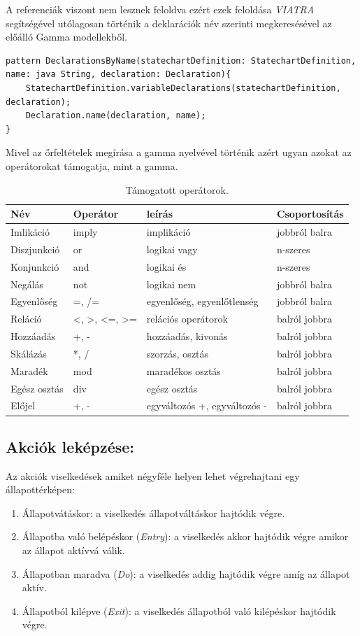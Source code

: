 A referenciák viszont nem lesznek feloldva ezért ezek feloldása \emph{VIATRA} segítségével utólagosan történik a deklarációk név szerinti megkeresésével az előálló Gamma modellekből.
\lstset{style=VQL}
\begin{lstlisting}
pattern DeclarationsByName(statechartDefinition: StatechartDefinition, name: java String, declaration: Declaration){
	StatechartDefinition.variableDeclarations(statechartDefinition, declaration);
	Declaration.name(declaration, name);
}
\end{lstlisting}
 Mivel az őrfeltételek megírása a gamma nyelvével történik azért ugyan azokat az operátorokat támogatja, mint a gamma.

\begin{table}[!h]
	\footnotesize
	\centering
	\begin{tabular}{ l l l l }
		Név & Operátor& leírás & Csoportosítás \\ \hline
		 Imlikáció & imply & implikáció & jobbról balra \\
		 Diszjunkció & or & logikai vagy & n-szeres\\
		 Konjunkció & and & logikai és & n-szeres \\
		 Negálás & not & logikai nem & jobbról balra \\
		 Egyenlőség & =, /= & egyenlőség, egyenlőtlenség & jobbról balra \\
		 Reláció & <, >, <=, >= & relációs operátorok & balról jobbra \\  
		 Hozzáadás & +, - & hozzáadás, kivonás & balról jobbra \\
		 Skálázás & *, / & szorzás, osztás & balról jobbra \\
		 Maradék & mod & maradékos osztás & balról jobbra \\
		 Egész osztás & div & egész osztás & balról jobbra \\
		 Előjel & +, - & egyváltozós +, egyváltozós - & balról jobbra
	\end{tabular}
	\caption{Támogatott operátorok.}
	\label{table:operators}
\end{table}


\subsection{Akciók leképzése:}
Az akciók viselkedések amiket négyféle helyen lehet végrehajtani egy állapottérképen:

\begin{enumerate}
	\item Állapotvátáskor: a viselkedés állapotváltáskor hajtódik végre.
	\item Állapotba való belépéskor (\emph{Entry}): a viselkedés akkor hajtódik végre amikor az állapot aktívvá válik.
	\item Állapotban maradva (\emph{Do}): a viselkedés addig hajtódik végre amíg az állapot aktív.
	\item Állapotból kilépve (\emph{Exit}): a viselkedés állapotból való kilépéskor hajtódik végre.
\end{enumerate}

